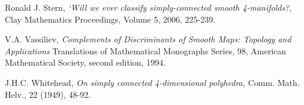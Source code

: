 \documentclass{article}
\begin{document}
\begin{thebibliography}{99}
 Ronald J. Stern, {\it `Will we ever classify simply-connected 
smooth 4-manifolds?\/}, Clay Mathematics Proceedings, Volume 5, 2006, 225-239.

 V.A. Vassiliev, {\it Complements of Discriminants of Smooth
Maps: Topology and Applications\/}  Translations of Mathematical Monographs 
Series, 98,  American Mathematical Society, second edition, 1994. 

 J.H.C. Whitehead, {\it On simply connected 4-dimensional
polyhedra,\/} Comm. Math. Helv., 22 (1949), 48-92.

\end{thebibliography}
\end{document}
